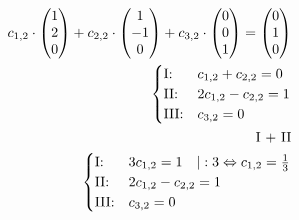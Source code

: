 \begin{align*}
    c_{1,2} \cdot \begin{pmatrix}
                      1 \\ 2 \\ 0
                  \end{pmatrix} + c_{2, 2} \cdot \begin{pmatrix}
                                                     1 \\ -1 \\ 0
                                                 \end{pmatrix} + c_{3, 2} \cdot \begin{pmatrix}
                                                                                    0 \\ 0 \\ 1
                                                                                \end{pmatrix} = \begin{pmatrix}
                                                                                                    0 \\ 1 \\ 0
                                                                                                \end{pmatrix}                \\
    \begin{cases}
        \text{I:\@}   & c_{1,2} + c_{2,2} = 0  \\
        \text{II:\@}  & 2c_{1,2} - c_{2,2} = 1 \\
        \text{III:\@} & c_{3,2} = 0
    \end{cases}                                                                                    \\
    \text{I + II}                                                                                                             \\
    \begin{cases}
        \text{I:\@}   & 3c_{1,2}  = 1 \quad | : 3 \Leftrightarrow c_{1,2} = \frac{1}{3} \\
        \text{II:\@}  & 2c_{1,2} - c_{2,2} = 1                                          \\
        \text{III:\@} & c_{3,2} = 0
    \end{cases}                                           \\

\end{align*}
